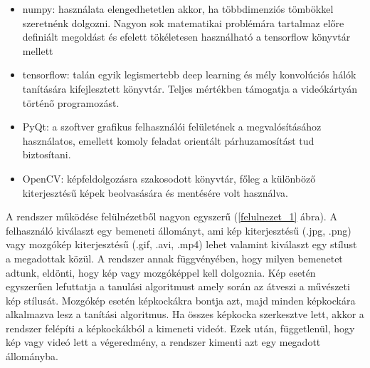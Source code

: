 \documentclass[12pt, a4paper, oneside]{book}
\theoremstyle{tetel}
\begin{document}
\begin{itemize}
	\item numpy\cite{24}: használata elengedhetetlen akkor, ha többdimenziós tömbökkel szeretnénk dolgozni. Nagyon sok matematikai problémára tartalmaz előre definiált megoldást és efelett tökéletesen használható a tensorflow könyvtár mellett
	\item tensorflow\cite{7}: talán egyik legismertebb deep learning és mély konvolúciós hálók tanítására kifejlesztett könyvtár. Teljes mértékben támogatja a videókártyán történő programozást.
	\item PyQt\cite{25}: a szoftver grafikus felhasználói felületének a megvalósításához használatos, emellett komoly feladat orientált párhuzamosítást tud biztosítani.
	\item OpenCV\cite{26}: képfeldolgozásra szakosodott könyvtár, főleg a különböző kiterjesztésű képek beolvasására és mentésére volt használva.
\end{itemize}

A rendszer működése felülnézetből nagyon egyszerű (\ref{felulnezet_1} ábra). A felhasználó kiválaszt egy bemeneti állományt, ami kép kiterjesztésű (.jpg, .png) vagy mozgókép kiterjesztésű (.gif, .avi, .mp4) lehet valamint kiválaszt egy stílust a megadottak közül. A rendszer annak függvényében, hogy milyen bemenetet adtunk, eldönti, hogy kép vagy mozgóképpel kell dolgoznia. Kép esetén egyszerűen lefuttatja a tanulási algoritmust amely során az átveszi a művészeti kép stílusát. Mozgókép esetén képkockákra bontja azt, majd minden képkockára alkalmazva lesz a tanítási algoritmus. Ha összes képkocka szerkesztve lett, akkor a rendszer felépíti a képkockákból a kimeneti videót. Ezek után, függetlenül, hogy kép vagy videó lett a végeredmény, a rendszer kimenti azt egy megadott állományba.
\end{document}
